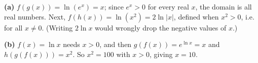 \textbf{(a)} $f(g(x))=\ln\left(e^x\right)=x$; since $e^x>0$ for every real $x$, the domain is all real numbers. Next, $f(h(x))=\ln\left(x^2\right)=2\ln|x|$, defined when $x^2>0$, i.e. for all $x\ne0$. (Writing $2\ln x$ would wrongly drop the negative values of $x$.)

\textbf{(b)} $f(x)=\ln x$ needs $x>0$, and then $g(f(x))=e^{\ln x}=x$ and $h(g(f(x)))=x^2$. So $x^2=100$ with $x>0$, giving $\boxed{x=10}$.
